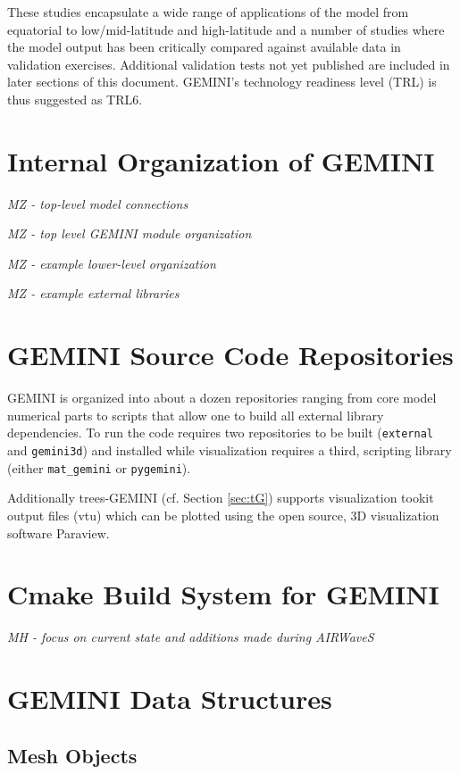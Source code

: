 \documentclass[11pt,letterpaper]{article}
\begin{document}
These studies encapsulate a wide range of applications of the model from equatorial to low/mid-latitude and high-latitude and a number of studies where the model output has been critically compared against available data in validation exercises.  Additional validation tests not yet published are included in later sections of this document.  GEMINI's technology readiness level (TRL) is thus suggested as TRL6.  

\section{Internal Organization of GEMINI}

\emph{MZ - top-level model connections}

\emph{MZ - top level GEMINI module organization}

\emph{MZ - example lower-level organization}

\emph{MZ - example external libraries}



\section{GEMINI Source Code Repositories}

GEMINI is organized into about a dozen repositories ranging from core model numerical parts to scripts that allow one to build all external library dependencies.  To run the code requires two repositories to be built (\texttt{external} and \texttt{gemini3d}) and installed while visualization requires a third, scripting library (either \texttt{mat\_gemini} or \texttt{pygemini}).  

Additionally trees-GEMINI (cf. Section \ref{sec:tG}) supports visualization tookit output files (vtu) which can be plotted using the open source, 3D visualization software Paraview.  


\section{Cmake Build System for GEMINI}

\emph{MH - focus on current state and additions made during AIRWaveS}



\section{GEMINI Data Structures}

\subsection{Mesh Objects}
\end{document}
